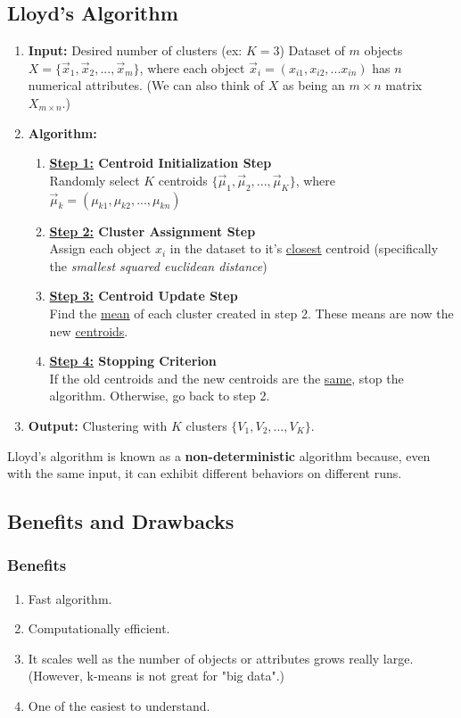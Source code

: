 \documentclass[11pt]{elegantbook}
\begin{document}
\subsection{Lloyd's Algorithm}
\begin{enumerate}
    \item \textbf{Input:}
    \subitem Desired number of clusters (ex: $K=3$)
    \subitem Dataset of $m$ objects $X=\{\vec{x}_1,\vec{x}_2,...,\vec{x}_m\}$, where each object $\vec{x}_i=(x_{i1},x_{i2},...x_{in})$ has $n$ numerical attributes. (We can also think of $X$ as being an $m\times n$ matrix $X_{m\times n}$.)
    \item \textbf{Algorithm:}
    \begin{enumerate}[$\bullet$]
        \item \textbf{\underline{Step 1:} Centroid Initialization Step}\\
        Randomly select $K$ centroids $\{\vec{\mu}_1,\vec{\mu}_2,...,\vec{\mu}_K\}$, where $\vec{\mu}_k=(\mu_{k1},\mu_{k2},...,\mu_{kn})$
        \item \textbf{\underline{Step 2:} Cluster Assignment Step}\\
        Assign each object $x_i$ in the dataset to it's \underline{closest} centroid (specifically the \textit{smallest squared euclidean distance})
        \item \textbf{\underline{Step 3:} Centroid Update Step}\\
        Find the \underline{mean} of each cluster created in step 2. These means are now the new \underline{centroids}.
        \item \textbf{\underline{Step 4:} Stopping Criterion}\\
        If the old centroids and the new centroids are the \underline{same}, stop the algorithm. Otherwise, go back to step 2.
    \end{enumerate}
    \item \textbf{Output:} Clustering with $K$ clusters $\{V_1,V_2,...,V_K\}$.
\end{enumerate}
Lloyd's algorithm is known as a \textbf{non-deterministic} algorithm because,
even with the same input, it can exhibit different behaviors on different runs.

\subsection{Benefits and Drawbacks}
\subsubsection*{Benefits}
\begin{enumerate}[$\bullet$]
    \item Fast algorithm.
    \item Computationally efficient.
    \item It scales well as the number of objects or attributes grows really large. (However, k-means is not great for "big data".)
    \item One of the easiest to understand.
\end{enumerate}
\end{document}
